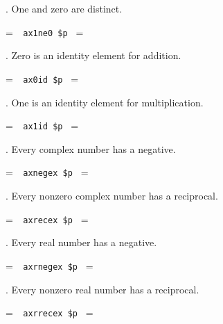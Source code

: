 . One and zero are distinct.

\setbox\startprefix=\hbox{\tt \ \ ax1ne0\ \$p\ }
\setbox\contprefix=\hbox{\tt \ \ \ \ \ \ \ \ \ \ \ \ }
\startm
\m{\vdash}\m{\ne}
\endm

. Zero is an identity element for addition.

\setbox\startprefix=\hbox{\tt \ \ ax0id\ \$p\ }
\setbox\contprefix=\hbox{\tt \ \ \ \ \ \ \ \ \ \ \ }
\startm
\m{\vdash}\m{(}\m{\in}\m{\rightarrow}\m{(}\m{+}%
\m{)}\m{=}\m{)}
\endm

. One is an identity element for multiplication.

\setbox\startprefix=\hbox{\tt \ \ ax1id\ \$p\ }
\setbox\contprefix=\hbox{\tt \ \ \ \ \ \ \ \ \ \ \ }
\startm
\m{\vdash}\m{(}\m{\in}\m{\rightarrow}\m{(}\m{\cdot}%
\m{)}\m{=}\m{)}
\endm

. Every complex number has a negative.

\setbox\startprefix=\hbox{\tt \ \ axnegex\ \$p\ }
\setbox\contprefix=\hbox{\tt \ \ \ \ \ \ \ \ \ \ \ \ \ }
\startm
\m{\vdash}\m{(}\m{\in}\m{\rightarrow}\m{\exists}\m{\in}%
\m{(}\m{+}\m{)}\m{=}\m{)}
\endm

. Every nonzero complex number has a reciprocal.

\setbox\startprefix=\hbox{\tt \ \ axrecex\ \$p\ }
\setbox\contprefix=\hbox{\tt \ \ \ \ \ \ \ \ \ \ \ \ \ }
\startm
\m{\vdash}\m{(}\m{\in}\m{\rightarrow}\m{(}\m{\ne}%
\m{\rightarrow}\m{\exists}\m{\in}\m{(}\m{\cdot}%
\m{)}\m{=}\m{)}\m{)}
\endm

. Every real number has a negative.

\setbox\startprefix=\hbox{\tt \ \ axrnegex\ \$p\ }
\setbox\contprefix=\hbox{\tt \ \ \ \ \ \ \ \ \ \ \ \ \ \ }
\startm
\m{\vdash}\m{(}\m{\in}\m{\rightarrow}\m{\exists}\m{\in}%
\m{(}\m{+}\m{)}\m{=}\m{)}
\endm

. Every nonzero real number has a reciprocal.

\setbox\startprefix=\hbox{\tt \ \ axrrecex\ \$p\ }
\setbox\contprefix=\hbox{\tt \ \ \ \ \ \ \ \ \ \ \ \ \ \ }
\startm
\m{\vdash}\m{(}\m{\in}\m{\rightarrow}\m{(}\m{\ne}%
\m{\rightarrow}\m{\exists}\m{\in}\m{(}\m{\cdot}%
\m{)}\m{=}\m{)}\m{)}
\endm

